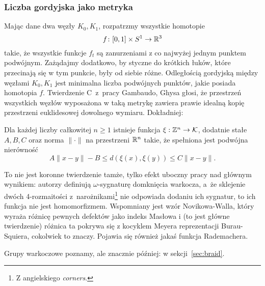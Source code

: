 
\subsubsection{Liczba gordyjska jako metryka}
Mając dane dwa węzły $K_0, K_1$, rozpatrzmy wszystkie homotopie
\begin{equation}
    f \colon [0,1] \times S^1 \to \mathbb R^3
\end{equation}
takie, że wszystkie funkcje $f_t$ są zanurzeniami z co najwyżej jednym punktem podwójnym.
Zażądajmy dodatkowo, by styczne do krótkich łuków, które przecinają się w tym punkcie, były od siebie różne.
Odległością gordyjską między węzłami $K_0, K_1$ jest minimalna liczba podwójnych punktów, jakie posiada homotopia $f$.
Twierdzenie C~z~pracy Gambaudo, Ghysa \cite{gambaudo2005} głosi, że przestrzeń wszystkich węzłów wyposażona w taką metrykę zawiera prawie idealną kopię przestrzeni euklidesowej dowolnego wymiaru.
%
%
Dokładniej:

\begin{proposition}
    Dla każdej liczby całkowitej $n \ge 1$ istnieje funkcja $\xi: \mathbb Z^n \to \mathcal{K}$, dodatnie stałe $A, B, C$ oraz norma $\|\cdot\|$ na przestrzeni $\mathbb R^n$ takie, że spełniona jest podwójna nierówność
    \begin{equation}
        A\|x-y\| - B \le d(\xi(x), \xi(y)) \le C\|x-y\|.
    \end{equation}
\end{proposition}

To nie jest koronne twierdzenie tamże, tylko efekt uboczny pracy nad głównym wynikiem: autorzy definiują $\omega$-sygnaturę domknięcia warkocza, a~że sklejenie dwóch 4-rozmaitości z~narożnikami\footnote{Z angielskiego \emph{corners}.} nie odpowiada dodaniu ich sygnatur, to ich funkcja nie jest homomorfizmem.
%
Wspomniany jest wzór Novikowa-Walla, który wyraża różnicę pewnych defektów jako indeks Masłowa i (to jest główne twierdzenie) różnica ta pokrywa się z kocyklem Meyera reprezentacji Burau-Squiera, cokolwiek to znaczy.
Pojawia się również jakaś funkcja Rademachera.
%
%
%
%
%

Grupy warkoczowe poznamy, ale znacznie później: w sekcji~\ref{sec:braid}.

